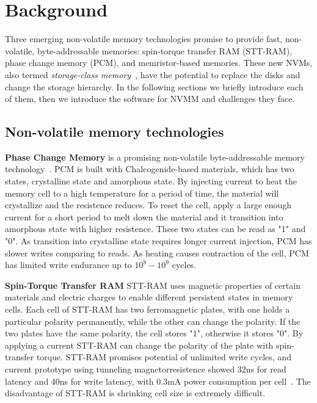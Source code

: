 \section{Background}
\label{sec:background}

Three emerging non-volatile memory technologies promise to provide fast,
 non-volatile, byte-addressable memories: spin-torque transfer RAM (STT-RAM),
phase change memory (PCM), and memristor-based memories. These new NVMs, also
termed \emph{storage-class memory}~\cite{scm}, have the potential to replace
the disks and change the storage hierarchy. In the following
sections we briefly introduce each of them, then we introduce the software
for NVMM and challenges they face.

\subsection{Non-volatile memory technologies}
\label{sec:hardware}

\textbf{Phase Change Memory} is a promising non-volatile byte-addressable
memory technology~\cite{PCM_EfficientMainMemory, PCMHierarchy}.
PCM is built with Chalcogenide-based materials, which has
two states, crystalline state and amorphous state. By
injecting current to heat the memory cell to a high temperature for a period
of time, the material will crystallize and the resistence reduces. 
To reset the cell,
apply a large enough current for a short period to melt down the
material and it transition into amorphous state with higher resistence.
 These two states can be read as "1" and "0". As transition into crystalline
state requires longer current injection, PCM has slower writes comparing to
reads.  
As heating causes contraction of the cell, PCM has limited write endurance
up to $10^8 - 10^9$ cycles.
 
\textbf{Spin-Torque Transfer RAM} STT-RAM uses magnetic properties of 
certain materials and electric charges to enable different persistent states 
in memory cells. Each cell of STT-RAM has two ferromagnetic plates, with
one holds a particular polarity permanently, while the other can change the
polarity. If the two plates have the same polarity, the cell stores "1",
otherwise it stores "0". By applying a current STT-RAM can change the polarity
of the plate with spin-transfer torque.
STT-RAM promises potential of unlimited write cycles, and
current prototype using tunneling magnetorresistence showed 32ns for
read latency and 40ns for write latency, with 0.3mA power consumption
per cell~\cite{sttram}. The disadvantage of STT-RAM is shrinking cell size is
extremely difficult.

